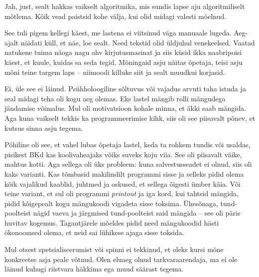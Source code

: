 
Jah, just, sealt hakkas vaikselt algoritmika, mis
sundis lapse aju algoritmiliselt mõtlema. Kõik vead paistsid kohe 
välja, kui olid midagi valesti mõelnud. 


See tuli pigem kellegi käest, me lastena ei viitsinud väga
manuaale lugeda. Aeg-ajalt näidati küll, et näe, loe sealt. Need tekstid olid üldjuhul venekeelsed. Vaatad natukene tuima näoga nagu ahv kirjutusmasinat ja siis 
küsid ikka naabripoisi käest, et kuule, kuidas sa seda tegid. 
Mõningaid asju näitas õpetaja, teisi asju mõni teine targem laps -- niimoodi killuke siit ja sealt muudkui korjasid. 


Ei, üle see ei läinud. Psühholoogiline sõltuvus või 
vajadus arvuti taha istuda ja seal midagi teha oli kogu aeg olemas. 
Eks lastel mängib rolli mängudega jändamise võimalus. Mul oli motivatsioon kohale minna, et äkki saab mängida. Aga 
kuna vaikselt tekkis ka programmeerimise kihk, siis oli see 
piisavalt põnev, et kutsus sinna asju tegema. 

Põhiline oli see, et vahel lubas õpetaja lastel, keda ta rohkem tundis või 
usaldas, pisikest BKd kas koolivaheajaks võiks suveks koju viia. See
oli piisavalt väike, mahtus kotti. Aga sellega oli üks probleem: 
kuna salvestusseadet ei olnud, siis oli 
kaks varianti. Kas tõmbasid makilindilt programmi sisse ja selleks pidid olema
kõik vajalikud kaablid, juhtmed ja oskused, et sellega õigesti 
ümber käia. Või teine variant, et sul oli programmi \emph{printout} ja iga 
kord, kui tahtsid mängida, pidid kõigepealt kogu mängukoodi 
vigadeta sisse toksima. Ühesõnaga, tund-poolteist nägid vaeva ja 
järgmised tund-poolteist said mängida -- see oli päris huvitav kogemus. 
Tagantjärele mõeldes pidid need mängukoodid hästi ökonoomsed olema, et neid sai lühikese ajaga 
sisse toksida. 


Mul otsest spetsialiseerumist või 
spinni ei tekkinud, et oleks kursi mõne konkreetse 
asja peale võtnud. Olen eluaeg olnud tarkvaraarendaja, ma ei ole 
läinud kuhugi riistvara häkkima ega muud säärast tegema. 

